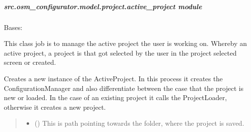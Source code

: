 \documentclass[letterpaper,10pt,english]{sphinxmanual}
\begin{document}
\subparagraph{src.osm\_configurator.model.project.active\_project module}
\label{\detokenize{apidoc/src.osm_configurator.model.project:module-src.osm_configurator.model.project.active_project}}\label{\detokenize{apidoc/src.osm_configurator.model.project:src-osm-configurator-model-project-active-project-module}}

\begin{fulllineitems}
\label{\detokenize{apidoc/src.osm_configurator.model.project:src.osm_configurator.model.project.active_project.ActiveProject}}
\pysigstartsignatures
{}
\pysigstopsignatures
\sphinxAtStartPar
Bases: 

\sphinxAtStartPar
This class job is to manage the active project the user is working on.
Whereby an active project, a project is that got selected by the user in the project selected screen or
created.

\begin{fulllineitems}
\label{\detokenize{apidoc/src.osm_configurator.model.project:src.osm_configurator.model.project.active_project.ActiveProject.__init__}}
\pysigstartsignatures
{}
\pysigstopsignatures
\sphinxAtStartPar
Creates a new instance of the ActiveProject. In this process it creates the ConfigurationManager and also
differentiate between the case that the project is new or loaded. In the case of an existing project it
calls the ProjectLoader, otherwise it creates a new project.
\begin{quote}\begin{description}
\begin{itemize}
\item {} 
\sphinxAtStartPar
{} () \textendash{} This is path pointing towards the folder, where the project is saved.


\end{itemize}
\end{description}
\end{quote}
\end{fulllineitems}
\end{fulllineitems}
\end{document}
